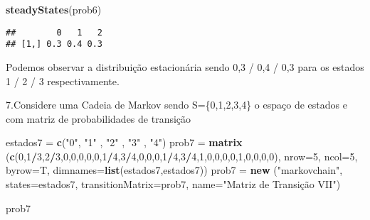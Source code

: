 \documentclass[
]{article}
\newenvironment{Shaded}{\begin{snugshade}}{\end{snugshade}}
\newcommand{\DataTypeTok}[1]{\textcolor[rgb]{0.13,0.29,0.53}{#1}}
\newcommand{\DecValTok}[1]{\textcolor[rgb]{0.00,0.00,0.81}{#1}}
\newcommand{\KeywordTok}[1]{\textcolor[rgb]{0.13,0.29,0.53}{\textbf{#1}}}
\newcommand{\NormalTok}[1]{#1}
\newcommand{\OperatorTok}[1]{\textcolor[rgb]{0.81,0.36,0.00}{\textbf{#1}}}
\newcommand{\StringTok}[1]{\textcolor[rgb]{0.31,0.60,0.02}{#1}}
\begin{document}
\begin{Shaded}
\begin{Highlighting}[]
\KeywordTok{steadyStates}\NormalTok{(prob6)}
\end{Highlighting}
\end{Shaded}

\begin{verbatim}
##        0   1   2
## [1,] 0.3 0.4 0.3
\end{verbatim}

Podemos observar a distribuição estacionária sendo 0,3 / 0,4 / 0,3 para
os estados 1 / 2 / 3 respectivamente.

7.Considere uma Cadeia de Markov sendo S=\{0,1,2,3,4\} o espaço de
estados e com matriz de probabilidades de transição

\begin{Shaded}
\begin{Highlighting}[]
\NormalTok{estados7 =}\StringTok{ }\KeywordTok{c}\NormalTok{(}\StringTok{"0"}\NormalTok{, }\StringTok{"1"}\NormalTok{ , }\StringTok{"2"}\NormalTok{ , }\StringTok{"3"}\NormalTok{ , }\StringTok{"4"}\NormalTok{)}
\NormalTok{prob7 =}\StringTok{ }\KeywordTok{matrix}\NormalTok{ (}\KeywordTok{c}\NormalTok{(}\DecValTok{0}\NormalTok{,}\DecValTok{1}\OperatorTok{/}\DecValTok{3}\NormalTok{,}\DecValTok{2}\OperatorTok{/}\DecValTok{3}\NormalTok{,}\DecValTok{0}\NormalTok{,}\DecValTok{0}\NormalTok{,}\DecValTok{0}\NormalTok{,}\DecValTok{0}\NormalTok{,}\DecValTok{0}\NormalTok{,}\DecValTok{1}\OperatorTok{/}\DecValTok{4}\NormalTok{,}\DecValTok{3}\OperatorTok{/}\DecValTok{4}\NormalTok{,}\DecValTok{0}\NormalTok{,}\DecValTok{0}\NormalTok{,}\DecValTok{0}\NormalTok{,}\DecValTok{1}\OperatorTok{/}\DecValTok{4}\NormalTok{,}\DecValTok{3}\OperatorTok{/}\DecValTok{4}\NormalTok{,}\DecValTok{1}\NormalTok{,}\DecValTok{0}\NormalTok{,}\DecValTok{0}\NormalTok{,}\DecValTok{0}\NormalTok{,}\DecValTok{0}\NormalTok{,}\DecValTok{1}\NormalTok{,}\DecValTok{0}\NormalTok{,}\DecValTok{0}\NormalTok{,}\DecValTok{0}\NormalTok{,}\DecValTok{0}\NormalTok{),}
                \DataTypeTok{nrow=}\DecValTok{5}\NormalTok{, }\DataTypeTok{ncol=}\DecValTok{5}\NormalTok{, }\DataTypeTok{byrow=}\NormalTok{T,}
                \DataTypeTok{dimnames=}\KeywordTok{list}\NormalTok{(estados7,estados7))}
\NormalTok{prob7 =}\StringTok{ }\KeywordTok{new}\NormalTok{ (}\StringTok{"markovchain"}\NormalTok{, }\DataTypeTok{states=}\NormalTok{estados7, }\DataTypeTok{transitionMatrix=}\NormalTok{prob7, }\DataTypeTok{name=}\StringTok{"Matriz de Transição VII"}\NormalTok{)}

\NormalTok{prob7}
\end{Highlighting}
\end{Shaded}
\end{document}
